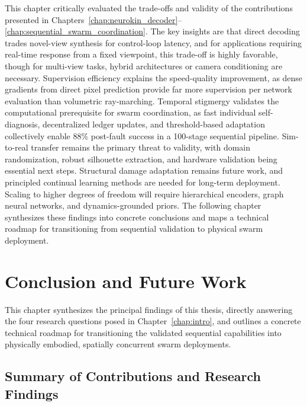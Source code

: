 \documentclass[12pt,a4paper,oneside]{report}
\begin{document}
This chapter critically evaluated the trade-offs and validity of the contributions presented in Chapters~\ref{chap:neurokin_decoder}--\ref{chap:sequential_swarm_coordination}. The key insights are that direct decoding trades novel-view synthesis for control-loop latency, and for applications requiring real-time response from a fixed viewpoint, this trade-off is highly favorable, though for multi-view tasks, hybrid architectures or camera conditioning are necessary. Supervision efficiency explains the speed-quality improvement, as dense gradients from direct pixel prediction provide far more supervision per network evaluation than volumetric ray-marching. Temporal stigmergy validates the computational prerequisite for swarm coordination, as fast individual self-diagnosis, decentralized ledger updates, and threshold-based adaptation collectively enable 88\% post-fault success in a 100-stage sequential pipeline. Sim-to-real transfer remains the primary threat to validity, with domain randomization, robust silhouette extraction, and hardware validation being essential next steps. Structural damage adaptation remains future work, and principled continual learning methods are needed for long-term deployment. Scaling to higher degrees of freedom will require hierarchical encoders, graph neural networks, and dynamics-grounded priors. The following chapter synthesizes these findings into concrete conclusions and maps a technical roadmap for transitioning from sequential validation to physical swarm deployment.

\clearpage

\chapter{Conclusion and Future Work}
\label{chap:conclusion_future_work}

This chapter synthesizes the principal findings of this thesis, directly answering the four research questions posed in Chapter~\ref{chap:intro}, and outlines a concrete technical roadmap for transitioning the validated sequential capabilities into physically embodied, spatially concurrent swarm deployments.

\section{Summary of Contributions and Research Findings}
\end{document}
